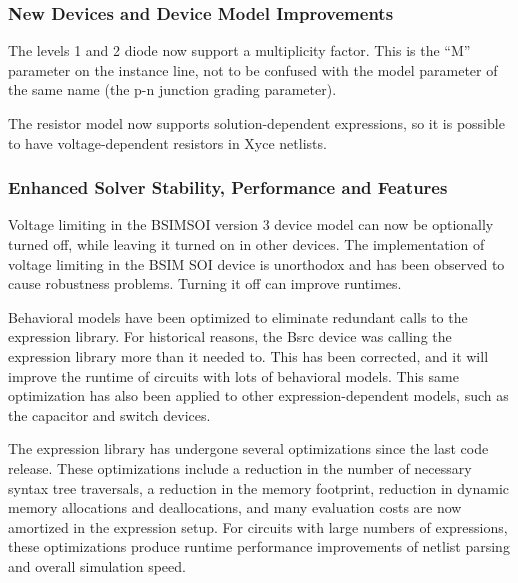 \documentclass[letterpaper]{scrartcl}
\begin{document}
\subsubsection*{New Devices and Device Model Improvements}
\begin{XyceItemize}
  \item The levels 1 and 2 diode now support a multiplicity factor.
    This is the ``M'' parameter on the instance line, not to be
    confused with the model parameter of the same name (the p-n
    junction grading parameter).
  \item The resistor model now supports solution-dependent
    expressions, so it is possible to have voltage-dependent resistors
    in Xyce netlists.
\end{XyceItemize}

\subsubsection*{Enhanced Solver Stability, Performance and Features}
\begin{XyceItemize}
  \item Voltage limiting in the BSIMSOI version 3 device model can now
    be optionally turned off, while leaving it turned on in other
    devices.  The implementation of voltage limiting in the BSIM SOI
    device is unorthodox and has been observed to cause robustness
    problems.  Turning it off can improve runtimes.
  \item Behavioral models have been optimized to eliminate redundant
    calls to the expression library.  For historical reasons, the Bsrc
    device was calling the expression library more than it needed to.
    This has been corrected, and it will improve the runtime of
    circuits with lots of behavioral models.  This same optimization
    has also been applied to other expression-dependent models, such
    as the capacitor and switch devices.
  \item The expression library has undergone several optimizations
    since the last code release.  These optimizations include a
    reduction in the number of necessary syntax tree traversals, a
    reduction in the memory footprint, reduction in dynamic memory
    allocations and deallocations, and many evaluation costs are now
    amortized in the expression setup.  For circuits with large
    numbers of expressions, these optimizations produce runtime
    performance improvements of netlist parsing and overall simulation
    speed.

\end{XyceItemize}
\end{document}
